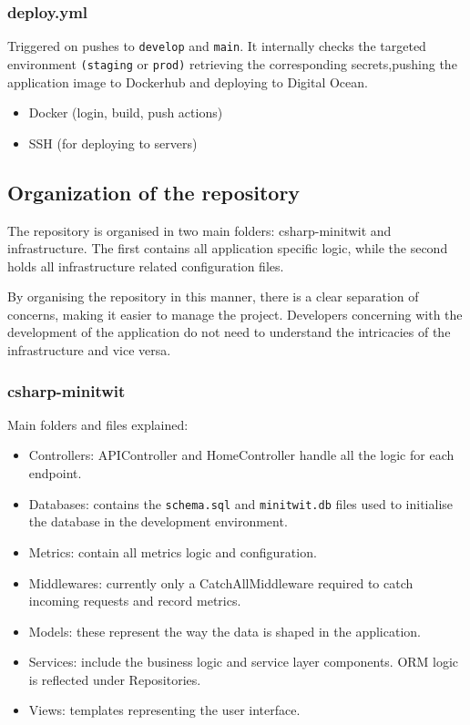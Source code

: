 \subsubsection{deploy.yml}
Triggered on pushes to \texttt{develop} and \texttt{main}. It internally checks the targeted environment \texttt{(staging} or \texttt{prod)} retrieving the corresponding secrets,pushing the application image to Dockerhub and deploying to Digital Ocean.
\begin{itemize}
    \item Docker (login, build, push actions)
    \item SSH (for deploying to servers)
\end{itemize}

\subsection{Organization of the repository}
The repository is organised in two main folders: csharp-minitwit and infrastructure. The first contains all application specific logic, while the second holds all infrastructure related configuration files.

By organising the repository in this manner, there is a clear separation of concerns, making it easier to manage the project. Developers concerning with the development of the application do not need to understand the intricacies of the infrastructure and vice versa. 

\subsubsection{csharp-minitwit}
Main folders and files explained:
\begin{itemize}
    \item Controllers: APIController and HomeController handle all the logic for each endpoint.
    \item Databases: contains the \texttt{schema.sql} and \texttt{minitwit.db} files used to initialise the database in the development environment.
    \item Metrics: contain all metrics logic and configuration.
    \item Middlewares: currently only a CatchAllMiddleware required to catch incoming requests and record metrics.
    \item Models: these represent the way the data is shaped in the application. %
    \item Services: include the business logic and service layer components. ORM logic is reflected under Repositories.
    \item Views: templates representing the user interface.
\end{itemize}

